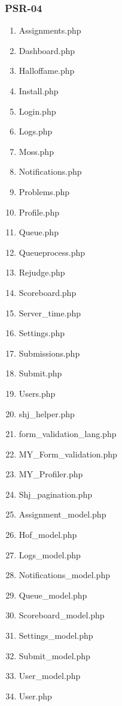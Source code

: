 \subsubsection{PSR-04}
\begin{enumerate}
	\item Assignments.php
	\item Dashboard.php
	\item Halloffame.php
	\item Install.php
	\item Login.php
	\item Logs.php
	\item Moss.php
	\item Notifications.php
	\item Problems.php
	\item Profile.php
	\item Queue.php
	\item Queueprocess.php
	\item Rejudge.php
	\item Scoreboard.php
	\item Server\_time.php
	\item Settings.php
	\item Submissions.php
	\item Submit.php
	\item Users.php
	\item shj\_helper.php
	\item form\_validation\_lang.php
	\item MY\_Form\_validation.php
	\item MY\_Profiler.php
	\item Shj\_pagination.php
	\item Assignment\_model.php
	\item Hof\_model.php
	\item Logs\_model.php
	\item Notifications\_model.php
	\item Queue\_model.php
	\item Scoreboard\_model.php
	\item Settings\_model.php
	\item Submit\_model.php
	\item User\_model.php
	\item User.php
\end{enumerate}


